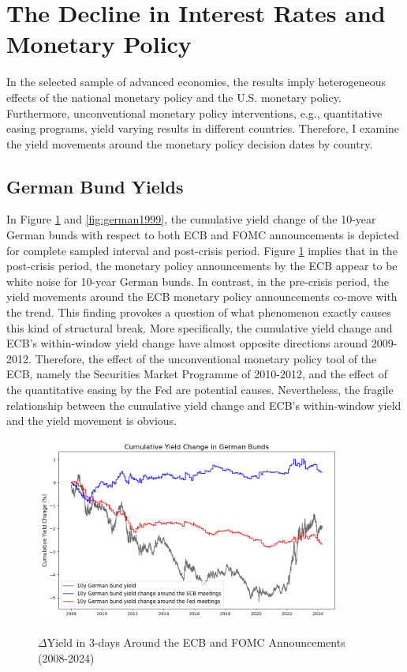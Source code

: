 \section{The Decline in Interest Rates and Monetary Policy}

In the selected sample of advanced economies, the results imply heterogeneous effects of the national monetary policy and the U.S. monetary policy. Furthermore, unconventional monetary policy interventions, e.g., quantitative easing programs, yield varying results in different countries. Therefore, I examine the yield movements around the monetary policy decision dates by country.

\subsection{German Bund Yields}

In Figure \ref{fig:german2008} and \ref{fig:german1999}, the cumulative yield change of the 10-year German bunds with respect to both ECB and FOMC announcements is depicted for complete sampled interval and post-crisis period. Figure \ref{fig:german2008} implies that in the post-crisis period, the monetary policy announcements by the ECB appear to be white noise for 10-year German bunds. In contrast, in the pre-crisis period, the yield movements around the ECB monetary policy announcements co-move with the trend. This finding provokes a question of what phenomenon exactly causes this kind of structural break. More specifically, the cumulative yield change and ECB's within-window yield change have almost opposite directions around 2009-2012. Therefore, the effect of the unconventional monetary policy tool of the ECB, namely the Securities Market Programme of 2010-2012, and the effect of the quantitative easing by the Fed are potential causes. Nevertheless, the fragile relationship between the cumulative yield change and ECB's within-window yield and the yield movement is obvious. \\

\begin{figure}[!htbp]
    \centering
    \caption{$\Delta$Yield in 3-days Around the ECB and FOMC Announcements (2008-2024)}   \includegraphics[width=0.9\textwidth]{figures/2008_german_bunds_figure1a.png}
    \label{fig:german2008}
\end{figure}

